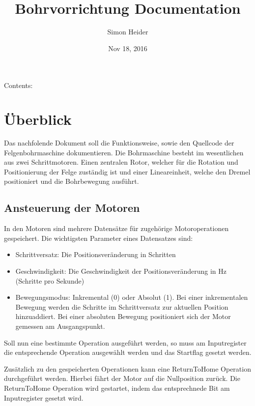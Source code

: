 \documentclass[letterpaper,10pt,english]{sphinxmanual}
\title{Bohrvorrichtung Documentation}
\date{Nov 18, 2016}
\author{Simon Heider}
\begin{document}
\maketitle
\tableofcontents
{}\label{index::doc}


Contents:


\chapter{Überblick}
\label{_xfcberblick:uberblick}\label{_xfcberblick::doc}\label{_xfcberblick:welcome-to-bohrvorrichtung-s-documentation}
Das nachfolende Dokument soll die Funktionsweise, sowie den Quellcode der Felgenbohrmaschine
dokumentieren. Die Bohrmaschine besteht im wesentlichen aus zwei Schrittmotoren. Einen
zentralen Rotor, welcher für die Rotation und Positionierung der Felge zuständig ist und
einer Lineareinheit, welche den Dremel positioniert und die Bohrbewegung ausführt.


\section{Ansteuerung der Motoren}
\label{_xfcberblick:ansteuerung-der-motoren}
In den Motoren sind mehrere Datensätze für zugehörige Motoroperationen gespeichert. Die wichtigsten
Parameter eines Datensatzes sind:
\begin{itemize}
\item {} 
Schrittversatz: Die Positionsveränderung in Schritten

\item {} 
Geschwindigkeit: Die Geschwindigkeit der Positionsveränderung in Hz (Schritte pro Sekunde)

\item {} 
Bewegungsmodus: Inkremental (0) oder Absolut (1). Bei einer inkrementalen Bewegung werden die Schritte im Schrittversatz zur aktuellen Position hinzuaddiert. Bei einer absoluten Bewegung positioniert sich der Motor gemessen am Ausgangspunkt.

\end{itemize}

Soll nun eine bestimmte Operation ausgeführt werden, so muss am Inputregister die entsprechende
Operation ausgewählt werden und das Startflag gesetzt werden.

Zusätzlich zu den gespeicherten Operationen kann eine ReturnToHome Operation durchgeführt werden.
Hierbei fährt der Motor auf die Nullposition zurück. Die ReturnToHome Operation wird gestartet,
indem das entsprechnede Bit am Inputregister gesetzt wird.
\end{document}

